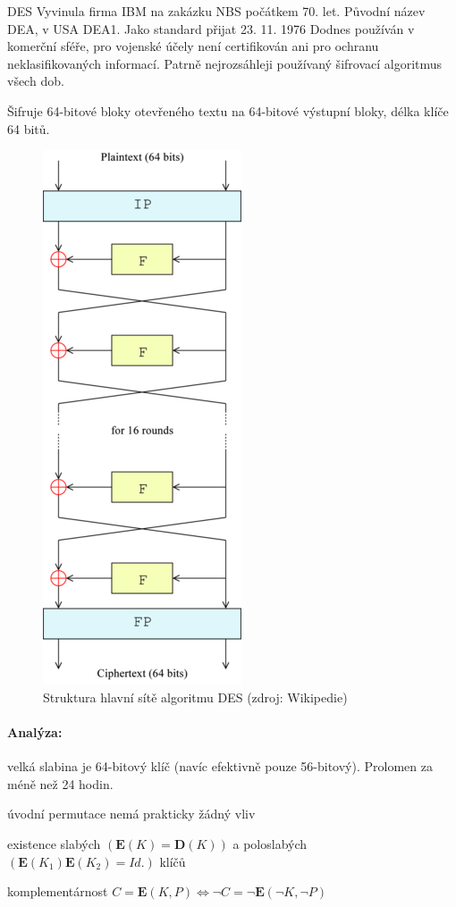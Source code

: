\begin{obecne}{DES}
  Vyvinula firma IBM na zakázku NBS počátkem 70. let. Původní název DEA, v USA
  DEA1. Jako standard přijat 23. 11. 1976 Dodnes používán v komerční sféře, pro
  vojenské účely není certifikován ani pro ochranu neklasifikovaných informací.
  Patrně nejrozsáhleji používaný šifrovací algoritmus všech dob.

  Šifruje 64-bitové bloky otevřeného textu na 64-bitové výstupní bloky, délka
  klíče 64 bitů.

  \begin{figure}[!ht]
    \begin{center}
      \includegraphics[scale=.7, angle=90]{informatika/algoritmy_a_ds/obrazky/DES-main-network.png}
      \caption{Struktura hlavní sítě algoritmu DES (zdroj: Wikipedie)}
    \end{center}
  \end{figure}

  \paragraph{Analýza:}
  \begin{pitemize}
    \item velká slabina je 64-bitový klíč (navíc efektivně pouze 56-bitový).
    Prolomen za méně než 24 hodin.
    \item úvodní permutace nemá prakticky žádný vliv
    \item existence slabých $(\mathbf{E}(K)=\mathbf{D}(K))$ a poloslabých
    $(\mathbf{E}(K_1)\mathbf{E}(K_2)=Id.)$ klíčů
    \item komplementárnost $C=\mathbf{E}(K,P)\Leftrightarrow\lnot C= \lnot
    \mathbf{E} (\lnot K,\lnot P)$
  \end{pitemize}
\end{obecne}

